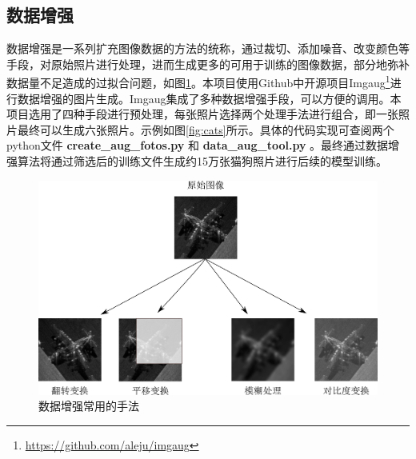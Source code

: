 \documentclass[a4paper,11pt]{article}
\begin{document}
\subsection{数据增强}
\label{sec:org4a2437e}
数据增强是一系列扩充图像数据的方法的统称，通过裁切、添加噪音、改变颜色等手段，对原始照片进行处理，进而生成更多的可用于训练的图像数据，部分地弥补数据量不足造成的过拟合问题，如图\ref{fig:imgaug}。本项目使用Github中开源项目Imgaug\footnote{\url{https://github.com/aleju/imgaug}}进行数据增强的图片生成。Imgaug集成了多种数据增强手段，可以方便的调用。本项目选用了四种手段进行预处理，每张照片选择两个处理手法进行组合，即一张照片最终可以生成六张照片。示例如图\ref{fig:cats}所示。具体的代码实现可查阅两个python文件 \textbf{create\_aug\_fotos.py} 和 \textbf{data\_aug\_tool.py} 。最终通过数据增强算法将通过筛选后的训练文件生成约15万张猫狗照片进行后续的模型训练。

\begin{figure}[htb]
\centering
\includegraphics[scale=0.5]{./figure/tuxiang.png}
\caption{数据增强常用的手法}
\label{fig:imgaug}
\end{figure}
\end{document}
